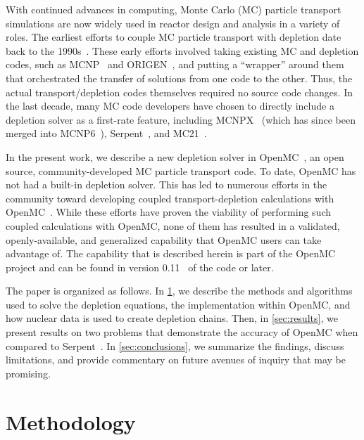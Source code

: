 \documentclass[3p,authoryear]{elsarticle}
\begin{document}
With continued advances in computing, Monte Carlo (MC) particle transport
simulations are now widely used in reactor design and analysis in a variety of
roles. The earliest efforts to couple MC particle transport with depletion date
back to the 1990s~\citep{moore1995inel,trellue1998lanl}. These early efforts
involved taking existing MC and depletion codes, such as
MCNP~\citep{goorley2012nt} and ORIGEN~\citep{croff1983nt}, and putting a
``wrapper'' around them that orchestrated the transfer of solutions from one
code to the other. Thus, the actual transport/depletion codes themselves
required no source code changes. In the last decade, many MC code developers
have chosen to directly include a depletion solver as a first-rate feature,
including MCNPX~\citep{waters2007aip} (which has since been merged into
MCNP6~\citep{goorley2012nt}), Serpent~\citep{leppanen2015ane}, and
MC21~\citep{griesheimer2015ane}.

In the present work, we describe a new depletion solver in
OpenMC~\citep{romano2015ane1}, an open source, community-developed MC particle
transport code. To date, OpenMC has not had a built-in depletion solver. This
has led to numerous efforts in the community toward developing coupled
transport-depletion calculations with OpenMC~\citep{gul2017ane,
lanversin2017icone, lanversin2019phd, liu2019nst, zhuang2020pne, zhao2020ned,
zhao2020cpc, zhang2020ane}. While these efforts have proven the viability of
performing such coupled calculations with OpenMC, none of them has resulted in a
validated, openly-available, and generalized capability that OpenMC users can
take advantage of. The capability that is described herein is part of the OpenMC
project and can be found in version 0.11~\citep{openmc-0110} of the code or
later.

The paper is organized as follows. In \cref{sec:methods}, we describe the
methods and algorithms used to solve the depletion equations, the implementation
within OpenMC, and how nuclear data is used to create depletion chains. Then, in
\cref{sec:results}, we present results on two problems that demonstrate the
accuracy of OpenMC when compared to Serpent~\citep{leppanen2015ane}. In
\cref{sec:conclusions}, we summarize the findings, discuss limitations, and
provide commentary on future avenues of inquiry that may be promising.

\section{Methodology}
\label{sec:methods}
\end{document}

